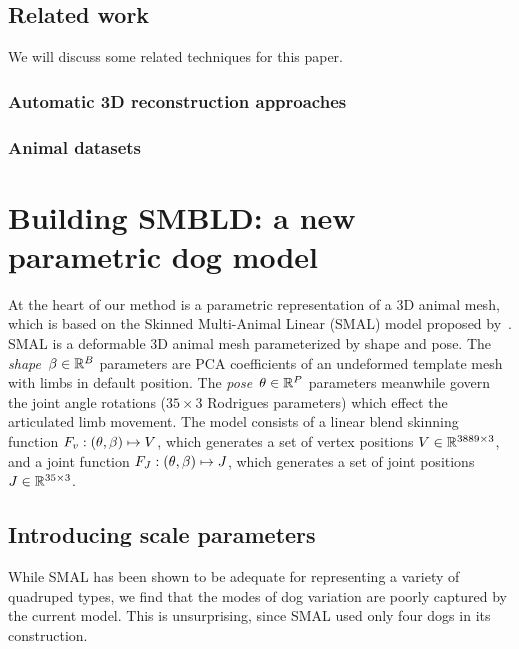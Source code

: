 \subsection{Related work}
We will discuss some related techniques for this paper.

\subsubsection{Automatic 3D reconstruction approaches}

\subsubsection{Animal datasets}



\section{Building SMBLD: a new parametric dog model}


At the heart of our method is a parametric representation of a 3D animal mesh, which is based on the Skinned Multi-Animal Linear (SMAL) model proposed by~\cite{zuffi2017menagerie}. SMAL is a deformable 3D animal mesh parameterized by shape and pose. The \emph{shape}~$\beta \in {\mathbb{R}^{B}}$ parameters are PCA coefficients of an undeformed template mesh with limbs in default position. The \emph{pose}~$\theta \in {\mathbb{R}^{P}}$ parameters meanwhile govern the joint angle rotations ($35 \times 3$ Rodrigues parameters) which effect the articulated limb movement. The model consists of a linear blend skinning function $F_{v}: (\theta, \beta) \mapsto V$, which generates a set of vertex positions $V \in {\mathbb{R}^{3889 \times 3}}$, and a joint function $F_{J}: (\theta, \beta) \mapsto J$, which generates a set of joint positions $J \in {\mathbb{R}^{35 \times 3}}$.

\subsection{Introducing scale parameters}
While SMAL has been shown to be adequate for representing a variety of quadruped types, we find that the modes of dog variation are poorly captured by the current model. This is unsurprising, since SMAL used only four dogs in its construction.


